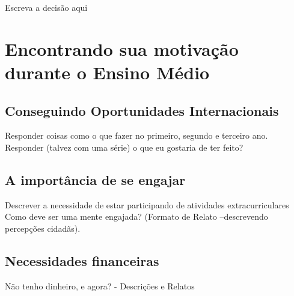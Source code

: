 \documentclass[11pt,fleqn]{book} %
\begin{document}
Escreva a decisão aqui


%


\chapter{Encontrando sua motivação durante o Ensino Médio}

\section{Conseguindo Oportunidades Internacionais}

Responder coisas como o que fazer no primeiro, segundo e terceiro ano.
Responder (talvez com uma série) o que eu gostaria de ter feito?

\section{A importância de se engajar}

Descrever a necessidade de estar participando de atividades extracurriculares
Como deve ser uma mente engajada? (Formato de Relato --descrevendo percepções cidadãs).


\section{Necessidades financeiras}

Não tenho dinheiro, e agora? - Descrições e Relatos

\end{document}
